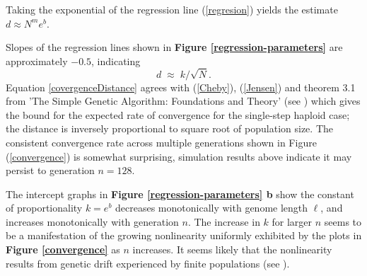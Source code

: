 Taking the exponential of the regression line (\ref{regresion}) yields
the estimate
$d \approx N^m e^b $.

Slopes of the regression lines shown in {\bf Figure \ref{regression-parameters}} are
approximately $-0.5$, indicating
\begin{equation}
\label{covergenceDistance}
d \; \approx \; k/\sqrt{N}.
\end{equation} 
Equation \ref{covergenceDistance} agrees with (\ref{Cheby}), (\ref{Jensen}) and 
theorem 3.1 from 'The Simple Genetic Algorithm: Foundations and Theory' (see \cite{Vose1999}) 
which gives the bound for the expected rate of convergence for the single-step haploid case; 
the distance is inversely proportional to square root of population size. 
The consistent convergence rate
across multiple generations shown in Figure (\ref{convergence}) is somewhat surprising, simulation
results above indicate it may persist to generation $n = 128$.

The intercept graphs in {\bf Figure \ref{regression-parameters} b} show the constant of proportionality $k =
e^b$ decreases monotonically with genome length $\ell$, and increases
monotonically with generation $n$.  The increase in $k$ for larger $n$
seems to be a manifestation of the growing nonlinearity uniformly
exhibited by the plots in {\bf Figure \ref{convergence}} as $n$ increases.  It seems
likely that the nonlinearity results from genetic drift experienced by
finite populations (see \cite{CrowKimura}).
